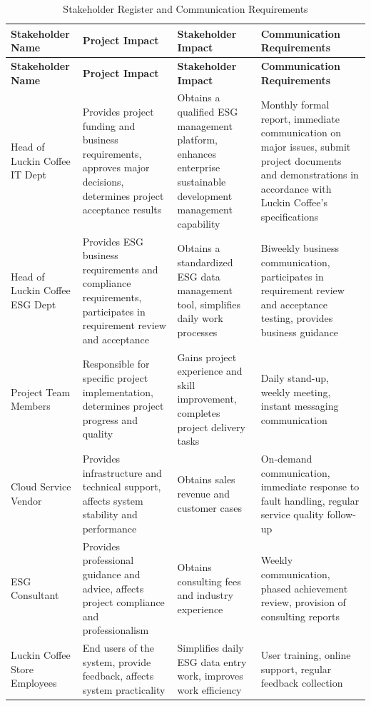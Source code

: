 \documentclass[12pt,a4paper]{article}
\begin{document}
\vspace{0.5em}
{\footnotesize
\begin{longtable}{@{}L{2.5cm} >{\raggedright\arraybackslash}p{4cm} >{\raggedright\arraybackslash}p{4cm} L{3.2cm}@{}}
\caption{Stakeholder Register and Communication Requirements}\label{tab:stakeholder_register}\\
\toprule
\textbf{Stakeholder Name}
  & \textbf{Project Impact}
  & \textbf{Stakeholder Impact}
  & \textbf{Communication Requirements}\\
\midrule
\endfirsthead
\toprule
\textbf{Stakeholder Name}
  & \textbf{Project Impact}
  & \textbf{Stakeholder Impact}
  & \textbf{Communication Requirements}\\
\midrule
\endhead
Head of Luckin Coffee IT Dept & Provides project funding and business requirements, approves major decisions, determines project acceptance results & Obtains a qualified ESG management platform, enhances enterprise sustainable development management capability & Monthly formal report, immediate communication on major issues, submit project documents and demonstrations in accordance with Luckin Coffee's specifications\\
\addlinespace
Head of Luckin Coffee ESG Dept & Provides ESG business requirements and compliance requirements, participates in requirement review and acceptance & Obtains a standardized ESG data management tool, simplifies daily work processes & Biweekly business communication, participates in requirement review and acceptance testing, provides business guidance\\
\addlinespace
Project Team Members & Responsible for specific project implementation, determines project progress and quality & Gains project experience and skill improvement, completes project delivery tasks & Daily stand-up, weekly meeting, instant messaging communication\\
\addlinespace
Cloud Service Vendor & Provides infrastructure and technical support, affects system stability and performance & Obtains sales revenue and customer cases & On-demand communication, immediate response to fault handling, regular service quality follow-up\\
\addlinespace
ESG Consultant & Provides professional guidance and advice, affects project compliance and professionalism & Obtains consulting fees and industry experience & Weekly communication, phased achievement review, provision of consulting reports\\
\addlinespace
Luckin Coffee Store Employees & End users of the system, provide feedback, affects system practicality & Simplifies daily ESG data entry work, improves work efficiency & User training, online support, regular feedback collection\\
\bottomrule
\end{longtable}
}
\end{document}
